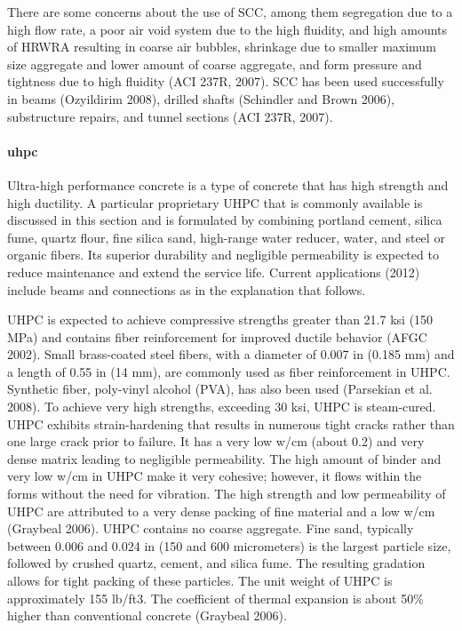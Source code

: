 There are some concerns about the use of SCC, among them segregation due to a high flow rate, a poor air void
system due to the high fluidity, and high amounts of HRWRA resulting in coarse air bubbles, shrinkage due to
smaller maximum size aggregate and lower amount of coarse aggregate, and form pressure and tightness due to high
fluidity (ACI 237R, 2007). SCC has been used successfully in beams (Ozyildirim 2008), drilled shafts (Schindler
and Brown 2006), substructure repairs, and tunnel sections (ACI 237R, 2007).

\paragraph{\acrfull*{uhpc}}

Ultra-high performance concrete is a type of concrete that has high strength and high ductility. A particular proprietary UHPC that is commonly available is discussed in this section and is formulated by combining portland cement, silica fume, quartz flour, fine silica sand, high-range water reducer, water, and steel or organic fibers. Its superior durability and negligible permeability is expected to reduce maintenance and extend the service life. Current applications (2012) include beams and connections as in the explanation that follows.

UHPC is expected to achieve compressive strengths greater than 21.7 ksi (150 MPa) and contains fiber reinforcement for improved ductile behavior (AFGC 2002). Small brass-coated steel fibers, with a diameter of 0.007 in (0.185 mm) and a length of 0.55 in (14 mm), are commonly used as fiber reinforcement in UHPC. Synthetic fiber, poly-vinyl alcohol (PVA), has also been used (Parsekian et al. 2008). To achieve very high strengths, exceeding 30 ksi, UHPC is steam-cured. UHPC exhibits strain-hardening that results in numerous tight cracks rather than one large crack prior to failure. It has a very low w/cm (about 0.2) and very dense matrix leading to negligible permeability. The high amount of binder and very low w/cm in UHPC make it very cohesive; however, it flows within the forms without the need for vibration. The high strength and low permeability of UHPC are attributed to a very dense packing of fine material and a low w/cm (Graybeal 2006). UHPC contains no coarse aggregate. Fine sand, typically between 0.006 and 0.024 in (150 and 600 micrometers) is the largest particle size, followed by crushed quartz, cement, and silica fume. The resulting gradation allows for tight packing of these particles. The unit weight of UHPC is approximately 155 lb/ft3. The coefficient of thermal expansion is about 50\% higher than conventional concrete (Graybeal 2006).

